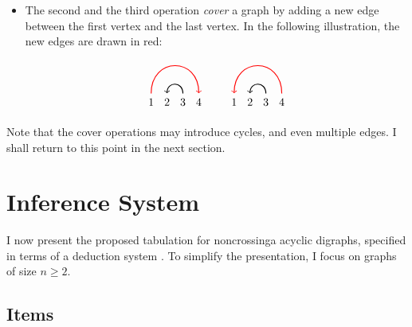 \documentclass[a4paper]{article}
\begin{document}
\begin{itemize}
	\item The second and the third operation \emph{cover} a graph by adding a new edge between the first vertex and the last vertex. In the following illustration, the new edges are drawn in red:
	\begin{displaymath}
		\begin{tikzpicture}[xscale=0.5]
			\node (n1) at (0, 0) {$\mathstrut 1$};
			\node (n2) at (1, 0) {$\mathstrut 2$};
			\node (n3) at (2, 0) {$\mathstrut 3$};
			\node (n4) at (3, 0) {$\mathstrut 4$};
			\path[thick, ->, red] (n1) edge[out=90, in=90] (n4);
			\path[thick, ->] (n3) edge[out=90, in=90] (n2);
		\end{tikzpicture}
		\qquad
		\begin{tikzpicture}[xscale=0.5]
			\node (n1) at (0, 0) {$\mathstrut 1$};
			\node (n2) at (1, 0) {$\mathstrut 2$};
			\node (n3) at (2, 0) {$\mathstrut 3$};
			\node (n4) at (3, 0) {$\mathstrut 4$};
			\path[thick, <-, red] (n1) edge[out=90, in=90] (n4);
			\path[thick, ->] (n3) edge[out=90, in=90] (n2);
		\end{tikzpicture}
	\end{displaymath}
\end{itemize}

Note that the cover operations may introduce cycles, and even multiple edges.
I shall return to this point in the next section.


\section{Inference System}

I now present the proposed tabulation for noncrossinga acyclic digraphs, specified in terms of a deduction system \citep{shieber1995principles}.
To simplify the presentation, I focus on graphs of size $n \geq 2$.

\subsection{Items}
\end{document}
